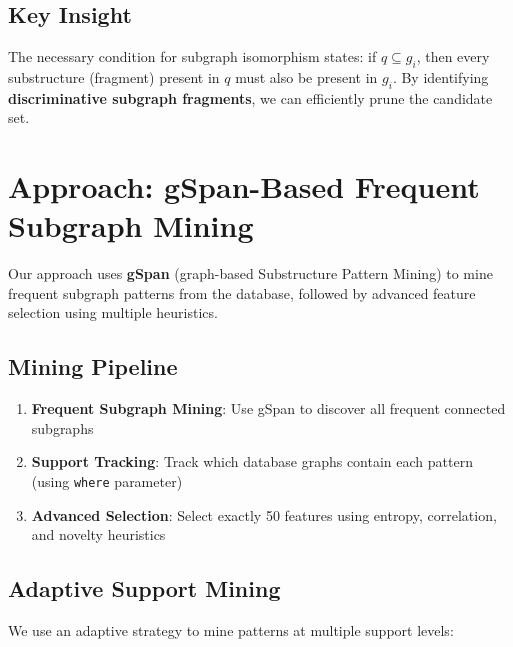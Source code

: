 \documentclass[12pt,a4paper]{article}
\begin{document}
\subsection{Key Insight}

The necessary condition for subgraph isomorphism states: if $q \subseteq g_i$, then every substructure (fragment) present in $q$ must also be present in $g_i$. By identifying \textbf{discriminative subgraph fragments}, we can efficiently prune the candidate set.

\section{Approach: gSpan-Based Frequent Subgraph Mining}

Our approach uses \textbf{gSpan} (graph-based Substructure Pattern Mining) to mine frequent subgraph patterns from the database, followed by advanced feature selection using multiple heuristics.

\subsection{Mining Pipeline}

\begin{enumerate}
    \item \textbf{Frequent Subgraph Mining}: Use gSpan to discover all frequent connected subgraphs
    \item \textbf{Support Tracking}: Track which database graphs contain each pattern (using \texttt{where} parameter)
    \item \textbf{Advanced Selection}: Select exactly 50 features using entropy, correlation, and novelty heuristics
\end{enumerate}

\subsection{Adaptive Support Mining}

We use an adaptive strategy to mine patterns at multiple support levels:
\end{document}
